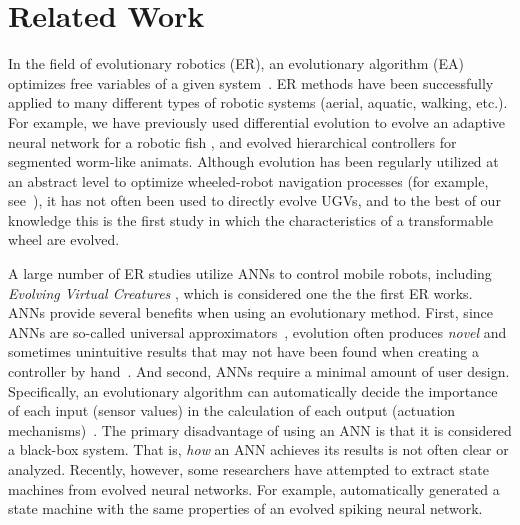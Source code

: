 \section{Related Work}
\label{sec:related-work}



In the field of evolutionary robotics (ER), an evolutionary algorithm (EA) optimizes free variables of a given system~\citep{Silva.EvolComp.Issues-ER.2016}.
%
ER methods have been successfully applied to many different types of robotic systems (aerial, aquatic, walking, etc.).
%
For example, we have previously used differential evolution to evolve an adaptive neural network for a robotic fish \citep{Clark.GECCO.MFAC.2015}, and \citet{Moore.2017.GECCO.Animat} evolved hierarchical controllers for segmented worm-like animats.
%
Although evolution has been regularly utilized at an abstract level to optimize wheeled-robot navigation processes (for example, see~\citet{Gomes.2015.GECCO.Maze}), it has not often been used to directly evolve UGVs, and to the best of our knowledge this is the first study in which the characteristics of a transformable wheel are evolved.
%


A large number of ER studies utilize ANNs to control mobile robots, including \emph{Evolving Virtual Creatures} \citep{Sims.1994.CGIT.Creatures}, which is considered one the the first ER works.
%
ANNs  provide several benefits when using an evolutionary method.
%
First, since ANNs are so-called universal approximators~\citep{Hornik.1989.NN.UniversalANN}, evolution often produces \emph{novel} and sometimes unintuitive results that may not have been found when creating a controller by hand~\citep{Bongard.2013.CACM.ER}.
%
And second, ANNs require a minimal amount of user design. Specifically, an evolutionary algorithm can automatically decide the importance of each input (sensor values) in the calculation of each output (actuation mechanisms)~\citep{Stanley.2002.EC.NEAT}.
%
The primary disadvantage of using an ANN is that it is considered a black-box system. That is, \emph{how} an ANN achieves its results is not often clear or analyzed.
%
Recently, however, some researchers have attempted to extract state machines from evolved neural networks.
%
For example, \citet{Wrobel.2017.SSCI.VSSNN} automatically generated a state machine with the same properties of an evolved spiking neural network.

